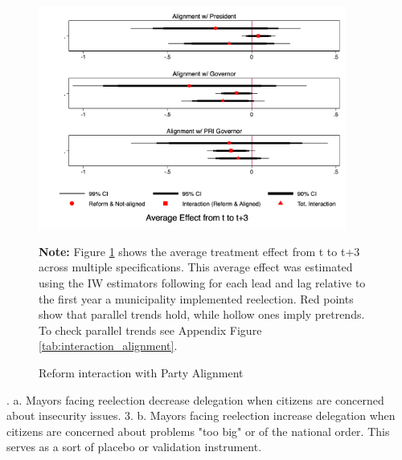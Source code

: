 \documentclass[12pt]{amsart}
\numberwithin{equation}{section}
\theoremstyle{definition}
\theoremstyle{definition}
\theoremstyle{definition}
\begin{document}
\begin{figure}[H]   
\centering
 \caption{Reform interaction with Party Alignment}
 \label{fig:alignment}
\includegraphics[width=0.9\textwidth]{../Figures/interaction_alignment_full.png}
       \captionsetup{justification=centering}
       
 \textbf{Note:} Figure \ref{fig:alignment} shows the average treatment effect from t to t+3 across multiple specifications. This average effect was estimated using the IW estimators following \citet{abraham_sun_2020} for each lead and lag relative to the first year a municipality implemented reelection. Red points show that parallel trends hold, while hollow ones imply pretrends. To check parallel trends see Appendix Figure \ref{tab:interaction_alignment}.  
\end{figure}  

. a. Mayors facing reelection decrease delegation when citizens are concerned about insecurity issues.  
3. b. Mayors facing reelection increase delegation when citizens are concerned about problems "too big" or of the national order. This serves as a sort of placebo or validation instrument.
\end{document}
